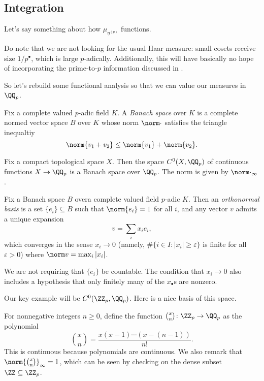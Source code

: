\documentclass{article}
\begin{document}
\subsection{Integration}
Let's say something about how $\mu_{\eta^{(p)}}$ functions.
\begin{remark}
	Do note that we are not looking for the usual Haar measure: small cosets receive size $1/p^\bullet$, which is large $p$-adically. Additionally, this will have basically no hope of incorporating the prime-to-$p$ information discussed in .
\end{remark}
So let's rebuild some functional analysis so that we can value our measures in $\QQ_p$.
\begin{definition}
	Fix a complete valued $p$-adic field $K$. A \textit{Banach space} over $K$ is a complete normed vector space $B$ over $K$ whose norm $\norm\cdot$ satisfies the triangle inequaltiy
	\[\norm{v_1+v_2}\le\norm{v_1}+\norm{v_2}.\]
\end{definition}
\begin{example}
	Fix a compact topological space $X$. Then the space $C^0(X,\QQ_p)$ of continuous functions $X\to\QQ_p$ is a Banach space over $\QQ_p$. The norm is given by $\norm\cdot_\infty$.
\end{example}
\begin{definition}
	Fix a Banach space $B$ overa complete valued field $p$-adic $K$. Then an \textit{orthonormal basis} is a set $\{e_i\}\subseteq B$ such that $\norm{e_i}=1$ for all $i$, and any vector $v$ admits a unique expansion
	\[v=\sum_ix_ie_i,\]
	which converges in the sense $x_i\to0$ (namely, $\#\{i\in I:\left|x_i\right|\ge\varepsilon\}$ is finite for all $\varepsilon>0$) where $\norm v=\max_i\left|x_i\right|$.
\end{definition}
\begin{remark}
	We are not requiring that $\{e_i\}$ be countable. The condition that $x_i\to0$ also includes a hypothesis that only finitely many of the $x_\bullet$s are nonzero.
\end{remark}
Our key example will be $C^0(\ZZ_p,\QQ_p)$. Here is a nice basis of this space.
\begin{example}
	For nonnegative integers $n\ge0$, define the function $\binom xn\colon\ZZ_p\to\QQ_p$ as the polynomial
	\[\binom xn=\frac{x(x-1)\cdots(x-(n-1))}{n!}.\]
	This is continuous because polynomials are continuous. We also remark that $\norm{\binom xn}_\infty=1$, which can be seen by checking on the dense subset $\ZZ\subseteq\ZZ_p$.
\end{example}
\end{document}
